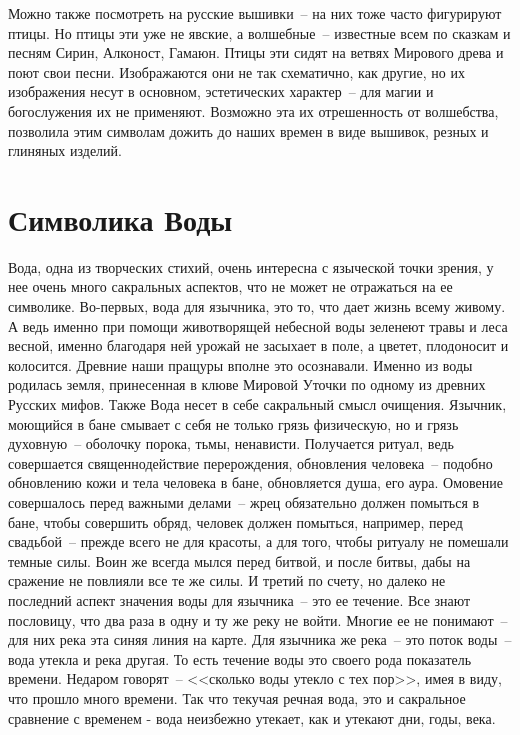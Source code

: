 \documentclass[pscyr,chapters]{hedwork}
\begin{document}
  Можно также посмотреть на русские вышивки~-- на них тоже часто фигурируют
  птицы. Но птицы эти уже не явские, а волшебные~-- известные всем по сказкам и
  песням Сирин, Алконост, Гамаюн. Птицы эти сидят на ветвях Мирового древа и
  поют свои песни. Изображаются они не так схематично, как другие, но их
  изображения несут в основном, эстетических характер~-- для магии и
  богослужения их не применяют. Возможно эта их отрешенность от волшебства,
  позволила этим символам дожить до наших времен в виде вышивок, резных и
  глиняных изделий.

  \chapter{Символика Воды}
  
  Вода, одна из творческих стихий, очень интересна с языческой точки зрения, у
  нее очень много сакральных аспектов, что не может не отражаться на ее
  символике. Во-первых, вода для язычника, это то, что дает жизнь всему
  живому. А ведь именно при помощи животворящей небесной воды зеленеют травы и
  леса весной, именно благодаря ней урожай не засыхает в поле, а цветет,
  плодоносит и колосится. Древние наши пращуры вполне это осознавали.
  Именно из воды родилась земля, принесенная в клюве Мировой Уточки по
  одному из древних Русских мифов. Также Вода несет в себе сакральный смысл
  очищения. Язычник, моющийся в бане смывает с себя не только грязь физическую,
  но и грязь духовную~-- оболочку порока, тьмы, ненависти. Получается ритуал,
  ведь совершается священнодействие перерождения, обновления человека~-- подобно
  обновлению кожи и тела человека в бане, обновляется душа, его аура. Омовение
  совершалось перед важными делами~-- жрец обязательно должен помыться в бане,
  чтобы совершить обряд, человек должен помыться, например, перед свадьбой~--
  прежде всего не для красоты, а для того, чтобы ритуалу не помешали темные
  силы. Воин же всегда мылся перед битвой, и после битвы, дабы на сражение не
  повлияли все те же силы. И третий по счету, но далеко не последний аспект
  значения воды для язычника~-- это ее течение. Все знают пословицу, что два
  раза в одну и ту же реку не войти. Многие ее не понимают~-- для них река эта
  синяя линия на карте. Для язычника же река~-- это поток воды~-- вода утекла и
  река другая. То есть течение воды это своего рода показатель времени. Недаром
  говорят~-- <<сколько воды утекло с тех пор>>, имея в виду, что прошло много
  времени. Так что текучая речная вода, это и сакральное сравнение с временем -
  вода неизбежно утекает, как и утекают дни, годы, века.
\end{document}
